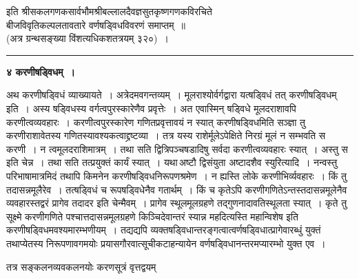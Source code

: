 \documentclass[11pt, openany]{book}
\begin{document}
\begin{center}
इति श्रीसकलगणकसार्वभौमश्रीबल्लालदैवज्ञसुतकृष्णगणकविरचिते\\
बीजविवृतिकल्पलतावतारे वर्णषड्विधविवरणं समाप्तम्~॥\\
(अत्र ग्रन्थसङ्ख्या विंशत्यधिकशतत्रयम् ३२०)~।\\
\vspace{1.5cm}
\rule{0.2\linewidth}{0.5pt}
\end{center}
 
\newpage
 \label{ch4}
\begin{center}
{\LARGE \textbf{४ करणीषड्विधम्~।}}
\end{center}

\vspace{2mm}
 अथ करणीषड्विधं व्याख्यायते~। अत्रेदमवगन्तव्यम्~। मूलराश्योर्वर्गद्वारा
यत्षड्विधं तत् करणीषड्विधम् इति~। अस्य षड्विधस्य वर्गत्वपुरस्कारेणैव प्रवृत्तेः~। अत एवास्मिन् षड्विधे मूलदराशावपि करणीत्वव्यवहारः~। करणीत्वपुरस्कारेण गणितप्रवृत्तावयं न स्यात् करणीषड्विधमिति सञ्ज्ञा तु करणीराशावेतस्य
गणितस्यावश्यकत्वाद्द्रष्टव्या~। तत्र यस्य राशेर्मूलेऽपेक्षिते निरग्रं मूलं न
सम्भवति स करणी~। न त्वमूलदराशिमात्रम्~। तथा सति द्वित्रिपञ्चषडादिषु सर्वदा
करणीत्वव्यवहारः स्यात्~। अस्तु स इति चेन्न~। तथा सति तत्प्रयुक्तं कार्यं स्यात्~।
यथा\textendash \,अष्टौ द्विसंयुता अष्टादशैव स्युरित्यादि~। नन्वस्तु परिभाषामात्रमिदं तथापि किमनेन करणीषड्विधनिरूपणश्रमेण~। न ह्यस्ति लोके करणीभिर्व्यवहारः~।
किं तु  तदासन्नमूलैरेव~। तत्षड्विधं च रूपषड्विधेनैव गतार्थम्~। किं च कृतेऽपि
करणीगणितेऽन्तस्तदासन्नमूलेनैव व्यवहारस्तद्वरं प्रागेव तदादर इति
चेन्मैवम्~। प्रागेव स्थूलमूलग्रहणे तद्गुणनादावतिस्थूलता स्यात्~। कृते तु सूक्ष्मे
करणीगणिते पश्चात्तदासन्नमूलग्रहणे किञ्चिदेवान्तरं स्यान्न महदित्यस्ति
महान्विशेष इति करणीषड्विधमवश्यमारम्भणीयम्~। तद्यद्यपि
व्यक्तषड्विधान्तरङ्गत्वात्वर्णषड्विधात्प्रागेवारब्धुं युक्तं 
तथाप्येतस्य निरूपणावगमयोः प्रयासगौरवात्सूचीकटाहन्यायेन
वर्णषड्विधानन्तरमप्यारम्भो युक्त एव~।\\

\vspace{-2mm}
 
{\bqt तत्र सङ्कलनव्यवकलनयोः करणसूत्रं वृत्तद्वयम्}\textendash 
\end{document}
